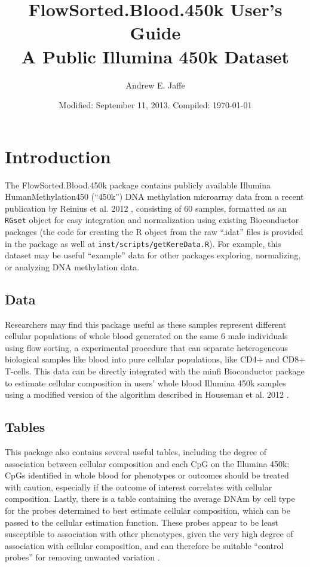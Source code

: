\documentclass[12pt]{article}
\title{FlowSorted.Blood.450k User's Guide\\
  A Public Illumina 450k Dataset}
\author{Andrew E. Jaffe}
\date{Modified: September 11, 2013.  Compiled: \today}
\newcommand{\Rcode}[1]{{\texttt{#1}}}
\newcommand{\Rpackage}[1]{\textsf{#1}}
\begin{document}
\maketitle
\setcounter{secnumdepth}{1} 

\section{Introduction}

The \Rpackage{FlowSorted.Blood.450k} package contains publicly available Illumina HumanMethylation450 (``450k'') DNA methylation microarray data from a recent publication by Reinius et al. 2012 \cite{reinius2012}, consisting of 60 samples, formatted as an \Rcode{RGset} object for easy integration and normalization using existing Bioconductor packages (the code for creating the R object from the raw ``.idat'' files is provided in the package as well at \texttt{inst/scripts/getKereData.R}). For example, this dataset may be useful ``example'' data for other packages exploring, normalizing, or analyzing DNA methylation data.

\subsection{Data}

Researchers may find this package useful as these samples represent different cellular populations of whole blood generated on the same 6 male individuals using flow sorting, a experimental procedure that can separate heterogeneous biological samples like blood into pure cellular populations, like CD4+ and CD8+ T-cells. This data can be directly integrated with the \Rpackage{minfi} Bioconductor package to estimate cellular composition in users' whole blood Illumina 450k samples using a modified version of the algorithm described in Houseman et al. 2012 \cite{houseman2012}.

\subsection{Tables}

This package also contains several useful tables, including the degree of association between cellular composition and each CpG on the Illumina 450k: CpGs identified in whole blood for phenotypes or outcomes should be treated with caution, especially if the outcome of interest correlates with cellular composition. Lastly, there is a table containing the average DNAm by cell type for the probes determined to best estimate cellular composition, which can be passed to the cellular estimation function. These probes appear to be least susceptible to association with other phenotypes, given the very high degree of association with cellular composition, and can therefore be suitable ``control probes'' for removing unwanted variation \cite{gagnon2012}.



\end{document}
